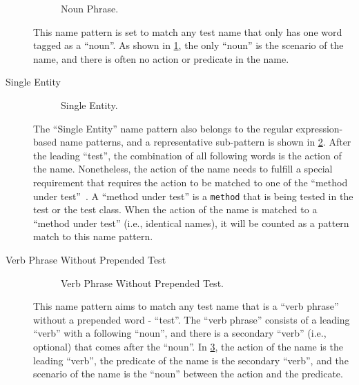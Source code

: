 \begin{description}
\begin{figure}[H]
\centering
     \begin{subfigure}{0.65\textwidth}
    \end{subfigure}
\caption{Noun Phrase.}
 \label{fig:noun-phrase}
\end{figure}


This name pattern is set to match any test name that only has one word tagged as a \enquote{noun}.
%
As shown in \cref{fig:noun-phrase}, the only \enquote{noun} is the scenario of the name, and there is often no action or predicate in the name.


\item[Single Entity]

\begin{figure}[H]
\centering
     \begin{subfigure}{0.65\textwidth}
    \end{subfigure}
\caption{Single Entity.}
\label{fig:single-entity}
\end{figure}

The \enquote{Single Entity} name pattern also belongs to the regular expression-based name patterns, and a representative sub-pattern is shown in \cref{fig:single-entity}.
%
After the leading \enquote{test}, the combination of all following words is the action of the name.
%
Nonetheless, the action of the name needs to fulfill a special requirement that requires the action to be matched to one of the \enquote{method under test}~\cite{zhang2016towards}.
%
A \enquote{method under test} is a \texttt{method} that is being tested in the test or the test class.
%
When the action of the name is matched to a \enquote{method under test} (i.e., identical names), it will be counted as a pattern match to this name pattern.


\item[Verb Phrase Without Prepended Test]

\begin{figure}[H]
\centering
    \begin{subfigure}{0.65\textwidth}
    \end{subfigure}
\caption{Verb Phrase Without Prepended Test.}
\label{fig:verb-without-test}
\end{figure}

This name pattern aims to match any test name that is a \enquote{verb phrase} without a prepended word - \enquote{test}.
%
The \enquote{verb phrase} consists of a leading \enquote{verb} with a following \enquote{noun}, and there is a secondary \enquote{verb} (i.e., optional) that comes after the \enquote{noun}.
%
In \cref{fig:verb-without-test}, the action of the name is the leading \enquote{verb}, the predicate of the name is the secondary \enquote{verb}, and the scenario of the name is the \enquote{noun} between the action and the predicate.


\end{description}
